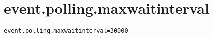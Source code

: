 \section{event.polling.maxwaitinterval}
\label{configuration:EventPollingMaxwaitinterval}
\ClearAPI
\TODO
{}
\begin{lstlisting}[style=Props,caption={Usage example for \textit{event.polling.maxwaitinterval}}]
event.polling.maxwaitinterval=30000
\end{lstlisting}